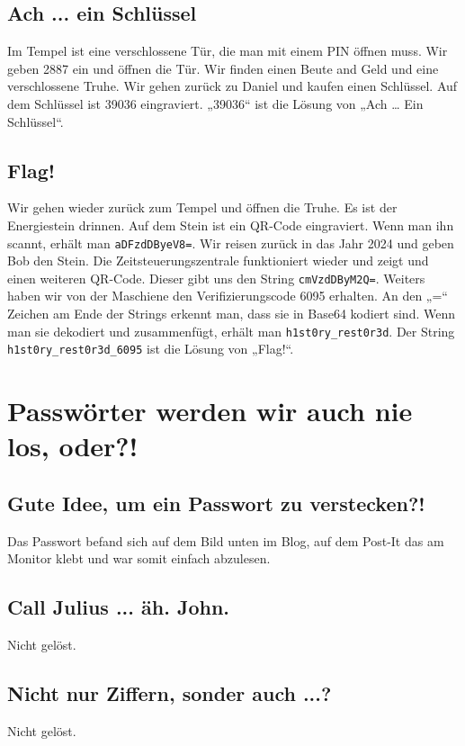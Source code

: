 \documentclass[12pt, a4paper, titlepage, oneside]{scrartcl}
\begin{document}
	\subsection{Ach ... ein Schl\"ussel}
	Im Tempel ist eine verschlossene Tür, die man mit einem PIN öffnen muss. Wir geben 2887 ein und
	öffnen die Tür. Wir finden einen Beute and Geld und eine verschlossene Truhe. Wir gehen zurück
	zu Daniel und kaufen einen Schlüssel. Auf dem Schlüssel ist 39036 eingraviert. „39036“ ist die
	Lösung von „Ach … Ein Schlüssel“.

	\subsection{Flag!}
	Wir gehen wieder zurück zum Tempel und öffnen die Truhe. Es ist der Energiestein drinnen. Auf
	dem Stein ist ein QR-Code eingraviert. Wenn man ihn scannt, erhält man \lstinline{aDFzdDByeV8=}. Wir
	reisen zurück in das Jahr 2024 und geben Bob den Stein. Die Zeitsteuerungszentrale funktioniert
	wieder und zeigt und einen weiteren QR-Code. Dieser gibt uns den String \lstinline{cmVzdDByM2Q=}.
	Weiters haben wir von der Maschiene den Verifizierungscode 6095 erhalten. An den „=“ Zeichen
	am Ende der Strings erkennt man, dass sie in Base64 kodiert sind. Wenn man sie dekodiert und
	zusammenfügt, erhält man \lstinline{h1st0ry_rest0r3d}. Der String \lstinline{h1st0ry_rest0r3d_6095} ist die Lösung
	von „Flag!“.

	\section{Passwörter werden wir auch nie los, oder?!}

	\subsection{Gute Idee, um ein Passwort zu verstecken?!}
	Das Passwort befand sich auf dem Bild unten im Blog, auf dem Post-It das am Monitor klebt und war somit einfach abzulesen.

	\subsection{Call Julius ... äh. John.}
	Nicht gelöst.

	\subsection{Nicht nur Ziffern, sonder auch ...?}
	Nicht gelöst.
\end{document}
